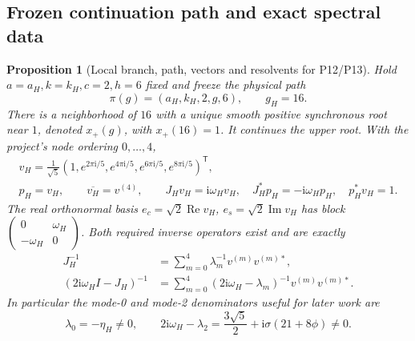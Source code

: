 \documentclass[11pt]{article}
\newcommand{\ii}{\mathrm{i}}
\DeclareMathOperator{\Ree}{Re}
\DeclareMathOperator{\Imm}{Im}
\newtheorem{proposition}[theorem]{Proposition}
\theoremstyle{definition}
\theoremstyle{remark}
\begin{document}
\subsection{Frozen continuation path and exact spectral data}
\label{slot:P11-3}
\begin{proposition}[Local branch, path, vectors and resolvents for P12/P13]
\label{prop:P11-data}
Hold $a=a_H,k=k_H,c=2,h=6$ fixed and freeze the physical path
\begin{equation}
 \boxed{\pi(g)=(a_H,k_H,2,g,6),\qquad g_H=16.}
 \label{eq:P11-path}
\end{equation}
There is a neighborhood of $16$ with a unique smooth positive
synchronous root near $1$, denoted $x_+(g)$, with $x_+(16)=1$.
It continues the upper root. With the project's node ordering $0,\ldots,4$,
\begin{equation}
 \begin{gathered}
 v_H=\frac1{\sqrt5}(1,e^{2\pi\ii/5},e^{4\pi\ii/5},
                         e^{6\pi\ii/5},e^{8\pi\ii/5})^{\mathsf T},\\
 p_H=v_H,\qquad \overline{v_H}=v^{(4)},\qquad
 J_Hv_H=\ii\omega_Hv_H,\quad J_H^*p_H=-\ii\omega_Hp_H,
 \quad p_H^*v_H=1.
 \end{gathered}
 \label{eq:P11-five-vectors}
\end{equation}
The real orthonormal basis $e_c=\sqrt2\Ree v_H$,
$e_s=\sqrt2\Imm v_H$ has block
$\left(\begin{smallmatrix}0&\omega_H\\-\omega_H&0\end{smallmatrix}\right)$.
Both required inverse operators exist and are exactly
\begin{equation}
 \begin{split}
 J_H^{-1}&=\sum_{m=0}^4\lambda_m^{-1}v^{(m)}v^{(m)*},\\
 (2\ii\omega_H I-J_H)^{-1}
   &=\sum_{m=0}^4(2\ii\omega_H-\lambda_m)^{-1}v^{(m)}v^{(m)*}.
 \end{split}
 \label{eq:P11-five-resolvents}
\end{equation}
In particular the mode-0 and mode-2 denominators useful for later work are
\begin{equation}
 \lambda_0=-\eta_H\ne0,\qquad
 2\ii\omega_H-\lambda_2
       =\frac{3\sqrt5}{2}+\ii\sigma(21+8\phi)\ne0.
 \label{eq:P11-denominators}
\end{equation}
\end{proposition}
\end{document}
